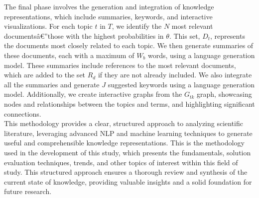\documentclass[runningheads]{llncs}
\begin{document}
The final phase involves the generation and integration of knowledge representations, which include summaries, keywords, and interactive visualizations. For each topic $t$ in $T$, we identify the $N$ most relevant documentsâ€”those with the highest probabilities in $\theta$. This set, $D_t$, represents the documents most closely related to each topic. We then generate summaries of these documents, each with a maximum of $W_b$ words, using a language generation model. These summaries include references to the most relevant documents, which are added to the set $R_d$ if they are not already included. We also integrate all the summaries and generate $J$ suggested keywords using a language generation model. Additionally, we create interactive graphs from the $G_{tk}$ graph, showcasing nodes and relationships between the topics and terms, and highlighting significant connections.\\

This methodology provides a clear, structured approach to analyzing scientific literature, leveraging advanced NLP and machine learning techniques to generate useful and comprehensible knowledge representations. This is the methodology used in the development of this study, which presents the fundamentals, solution evaluation techniques, trends, and other topics of interest within this field of study. This structured approach ensures a thorough review and synthesis of the current state of knowledge, providing valuable insights and a solid foundation for future research.
\end{document}
